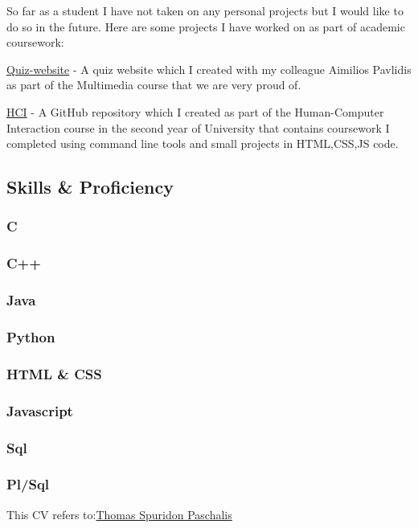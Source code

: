 \documentclass[
]{article}
\begin{document}
So far as a student I have not taken on any personal projects but I
would like to do so in the future. Here are some projects I have worked
on as part of academic coursework:

{ \href{https://quiz-pliroforikis.netlify.app/}{Quiz-website} } - {A
quiz website which I created with my colleague Aimilios Pavlidis as part
of the Multimedia course that we are very proud of.}

{
\href{https://github.com/p19pasc/hci/tree/2019110/projects/2019110}{HCI}
} - {A GitHub repository which I created as part of the Human-Computer
Interaction course in the second year of University that contains
coursework I completed using command line tools and small projects in
HTML,CSS,JS code.}

\hypertarget{skills-proficiency}{%
\subsection{\texorpdfstring{{ \emph{} \emph{} } Skills \&
Proficiency}{    Skills \& Proficiency}}\label{skills-proficiency}}

\hypertarget{c}{%
\subsubsection{C}\label{c}}

\hypertarget{c-1}{%
\subsubsection{C++}\label{c-1}}

\hypertarget{java}{%
\subsubsection{Java}\label{java}}

\hypertarget{python}{%
\subsubsection{Python}\label{python}}

\hypertarget{html-css}{%
\subsubsection{HTML \& CSS}\label{html-css}}

\hypertarget{javascript}{%
\subsubsection{Javascript}\label{javascript}}

\hypertarget{sql}{%
\subsubsection{Sql}\label{sql}}

\hypertarget{plsql}{%
\subsubsection{Pl/Sql}\label{plsql}}

{This CV refers to:\href{https://github.com/p19pasc}{Thomas Spuridon
Paschalis}}
\end{document}
